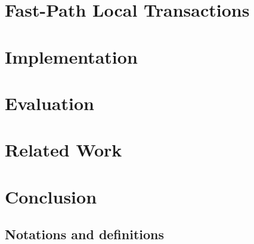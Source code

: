 \documentclass[preprint,10pt]{sigplanconf}
\begin{document}
\section{Fast-Path Local Transactions} \label{sec:alg}


\section{Implementation} \label{sec:impl}


\section{Evaluation} \label{sec:eval}


\section{Related Work} \label{sec:related}


\section{Conclusion} \label{sec:conclusions}












\begin{appendix}
	
	\section{Notations and definitions} \label{sec:app1}


\end{appendix}
\end{document}
